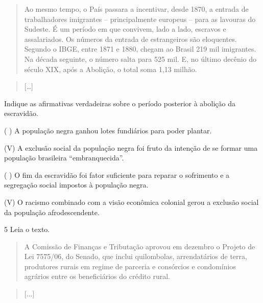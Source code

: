 \begin{quote}
Ao mesmo tempo, o País passara a incentivar, desde 1870, a entrada de
trabalhadores imigrantes -- principalmente europeus -- para as lavouras
do Sudeste. É um período em que convivem, lado a lado, escravos e
assalariados. Os números da entrada de estrangeiros são eloquentes.
Segundo o IBGE, entre 1871 e 1880, chegam ao Brasil 219 mil imigrantes.
Na década seguinte, o número salta para 525 mil. E, no último decênio do
século XIX, após a Abolição, o total soma 1,13 milhão.
\end{quote}

\begin{quote}
{[}\ldots{}{]}
\end{quote}


Indique as afirmativas verdadeiras sobre o período posterior à abolição
da escravidão.

( ) A população negra ganhou lotes fundiários para poder plantar.

(V) A exclusão social da população negra foi fruto da intenção de se
formar uma população brasileira ``embranquecida''.

( ) O fim da escravidão foi fator suficiente para reparar o sofrimento e
a segregação social impostos à população negra.

(V) O racismo combinado com a visão econômica colonial gerou a exclusão
social da população afrodescendente.

\num{5} Leia o texto.

\begin{quote}
A Comissão de Finanças e Tributação aprovou em dezembro o Projeto de Lei
7575/06, do Senado, que inclui quilombolas, arrendatários de terra,
produtores rurais em regime de parceria e consórcios e condomínios
agrários entre os beneficiários do crédito rural.
\end{quote}

\begin{quote}
{[}...{]}
\end{quote}


